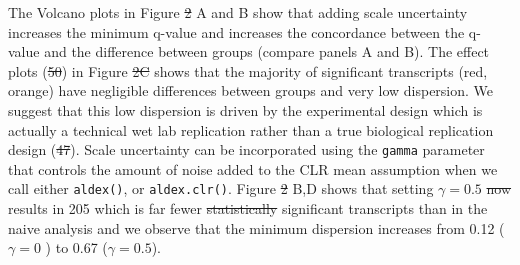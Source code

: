 \documentclass[
]{article}
\providecommand{\DIFadd}[1]{{\protect\color{blue}\uwave{#1}}} %
\providecommand{\DIFdel}[1]{{\protect\color{red}\sout{#1}}}                      %
\providecommand{\DIFaddbegin}{} %
\providecommand{\DIFaddend}{} %
\providecommand{\DIFdelbegin}{} %
\providecommand{\DIFdelend}{} %
\newcommand{\DIFscaledelfig}{0.5}
\newlength{\DIFdelgraphicswidth} %
\newlength{\DIFdelgraphicsheight} %
\newcommand{\DIFaddincludegraphics}[2][]{{\color{blue}\fbox{\DIFOincludegraphics[#1]{#2}}}} %
\newcommand{\DIFdelincludegraphics}[2][]{%
\sbox{\DIFdelgraphicsbox}{\DIFOincludegraphics[#1]{#2}}%
\settoboxwidth{\DIFdelgraphicswidth}{\DIFdelgraphicsbox} %
\settoboxtotalheight{\DIFdelgraphicsheight}{\DIFdelgraphicsbox} %
\scalebox{\DIFscaledelfig}{%
\parbox[b]{\DIFdelgraphicswidth}{\usebox{\DIFdelgraphicsbox}\\[-\baselineskip] \rule{\DIFdelgraphicswidth}{0em}}\llap{\resizebox{\DIFdelgraphicswidth}{\DIFdelgraphicsheight}{%
\setlength{\unitlength}{\DIFdelgraphicswidth}%
\begin{picture}(1,1)%
\thicklines\linethickness{2pt} %
{\color[rgb]{1,0,0}\put(0,0){\framebox(1,1){}}}%
{\color[rgb]{1,0,0}\put(0,0){\line( 1,1){1}}}%
{\color[rgb]{1,0,0}\put(0,1){\line(1,-1){1}}}%
\end{picture}%
}\hspace*{3pt}}} %
} %
\DeclareRobustCommand{\DIFaddbegin}{\DIFOaddbegin \let\includegraphics\DIFaddincludegraphics} %
\DeclareRobustCommand{\DIFaddend}{\DIFOaddend \let\includegraphics\DIFOincludegraphics} %
\DeclareRobustCommand{\DIFdelbegin}{\DIFOdelbegin \let\includegraphics\DIFdelincludegraphics} %
\DeclareRobustCommand{\DIFdelend}{\DIFOaddend \let\includegraphics\DIFOincludegraphics} %
\begin{document}
\DIFaddend The Volcano plots in Figure \DIFdelbegin \DIFdel{2 }\DIFdelend \DIFaddbegin \DIFadd{1 }\DIFaddend A and B show that adding scale uncertainty
increases the minimum q-value and increases the concordance between the
q-value and the difference between groups (compare panels A and B). The
effect plots (\DIFdelbegin \DIFdel{50}\DIFdelend \DIFaddbegin \DIFadd{47}\DIFaddend ) in Figure \DIFdelbegin \DIFdel{2C }\DIFdelend \DIFaddbegin \DIFadd{1C }\DIFaddend shows that the majority of significant
transcripts (red, orange) have negligible differences between groups and
very low dispersion. We suggest that this low dispersion is driven by
the experimental design which is actually a technical wet lab
replication rather than a true biological replication design (\DIFdelbegin \DIFdel{47}\DIFdelend \DIFaddbegin \DIFadd{44}\DIFaddend ). Scale
uncertainty can be incorporated using the \texttt{gamma} parameter that
controls the amount of noise added to the CLR mean assumption when we
call either \texttt{aldex()}, or \texttt{aldex.clr()}. Figure \DIFdelbegin \DIFdel{2 }\DIFdelend \DIFaddbegin \DIFadd{1 }\DIFaddend B,D
shows that setting \(\gamma=0.5\) \DIFdelbegin \DIFdel{now }\DIFdelend results in 205 which is far fewer
\DIFdelbegin \DIFdel{statistically }\DIFdelend significant transcripts than in the naive analysis and we observe that
the minimum dispersion increases from 0.12 (\(\gamma = 0\) ) to 0.67
(\(\gamma=0.5\)).
\end{document}
